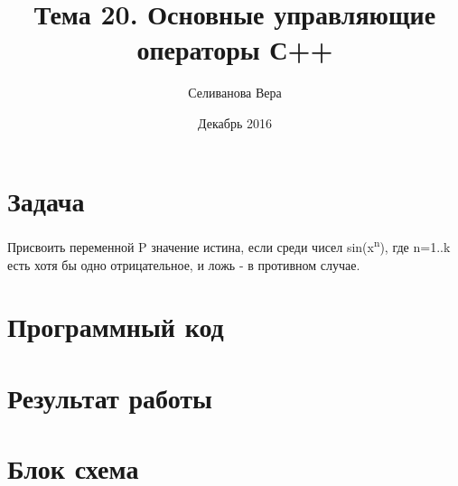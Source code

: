 \documentclass{article}
\title{Тема 20. Основные управляющие операторы С++}
\author{Селиванова Вера}
\date{Декабрь 2016}
\begin{document}
\maketitle

\pagebreak



\section{Задача}

Присвоить переменной P значение истина, если среди чисел sin(x\textsuperscript{n}), где n=1..k есть хотя бы одно отрицательное, и ложь - в противном случае.

\pagebreak



\section{Программный код}



\pagebreak



\section{Результат работы}



\pagebreak



\section{Блок схема}
\end{document}

